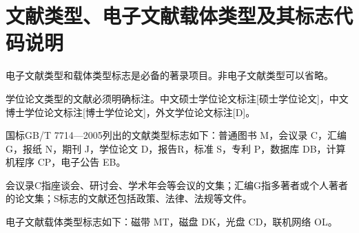 \section{文献类型、电子文献载体类型及其标志代码说明}

电子文献类型和载体类型标志是必备的著录项目。非电子文献类型可以省略。

学位论文类型的文献必须明确标注。中文硕士学位论文标注[硕士学位论文]，中文博士学位论文标注[博士学位论文]，外文学位论文标注[D]。

国标GB/T 7714—2005列出的文献类型标志如下：普通图书 M，会议录 C，汇编 G，报纸 N，期刊 J，学位论文 D，报告R，标准 S，专利 P，数据库 DB，计算机程序 CP，电子公告 EB。

会议录C指座谈会、研讨会、学术年会等会议的文集；汇编G指多著者或个人著者的论文集；S标志的文献还包括政策、法律、法规等文件。

电子文献载体类型标志如下：磁带 MT，磁盘 DK，光盘 CD，联机网络 OL。
